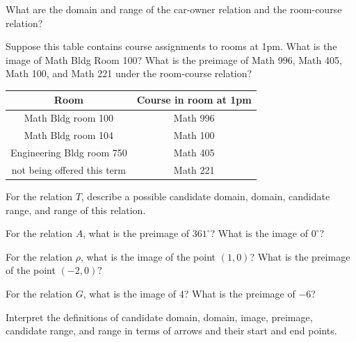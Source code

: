 \documentclass[11pt]{article}
\newenvironment{task}
	{\begin{mdframed}[linecolor=lightgray, linewidth=3pt]\raggedright}
	{\end{mdframed}}
\newcommand\degrees{^\circ}
\theoremstyle{definition}
\begin{document}
\begin{task}
What are the domain and range of the car-owner relation and the room-course relation? 

Suppose this table contains course assignments to rooms at 1pm. What is the image of Math Bldg Room 100? What is the preimage of Math 996, Math 405, Math 100, and Math 221 under the room-course relation? 

\begin{center}
\begin{tabular}{|c|c|}
\hline
Room & Course in room at 1pm \\ \hline
Math Bldg room 100 & Math 996 \\ 
Math Bldg room 104 & Math 100 \\ 
Engineering Bldg room 750 & Math 405 \\ 
not being offered this term & Math 221 \\ \hline
\end{tabular}
\end{center}

For the relation $T$, describe a possible candidate domain, domain, candidate range, and range of this relation.

For the relation $A$, what is the preimage of $361\degrees$? What is the image of $0\degrees$? 

For the relation $\rho$, what is the image of the point $(1,0)$? What is the preimage of the point $(-2,0)$? 

For the relation $G$, what is the image of $4$? What is the preimage of $-6$?

\end{task}

\begin{task}
Interpret the definitions of candidate domain, domain, image, preimage, candidate range, and range in terms of arrows and their start and end points.
\end{task}
\end{document}
